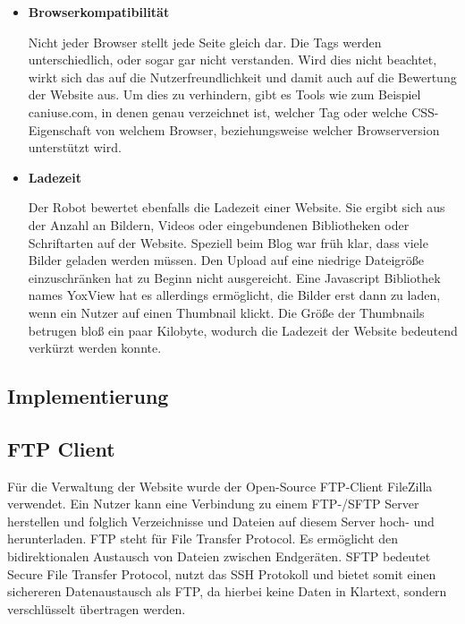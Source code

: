 {\begin{itemize}
      \item \textbf{Browserkompatibilität}

        Nicht jeder Browser stellt jede Seite gleich dar. Die Tags werden unterschiedlich, oder sogar gar nicht verstanden. Wird dies nicht beachtet, wirkt sich das auf die Nutzerfreundlichkeit
        und damit auch auf die Bewertung der Website aus. Um dies zu verhindern, gibt es Tools wie zum Beispiel {caniuse.com\cite{caniuse}}, in denen genau verzeichnet ist, welcher Tag oder welche CSS-Eigenschaft
        von welchem Browser, beziehungsweise welcher Browserversion unterstützt wird.

      \item \textbf{Ladezeit}

        Der Robot bewertet ebenfalls die Ladezeit einer Website. Sie ergibt sich aus der Anzahl an Bildern, Videos oder eingebundenen Bibliotheken oder Schriftarten auf der Website.
        Speziell beim Blog war früh klar, dass viele Bilder geladen werden müssen. Den Upload auf eine niedrige Dateigröße einzuschränken hat zu Beginn nicht ausgereicht.
        Eine Javascript Bibliothek names {YoxView\cite{yoxview}} hat es allerdings ermöglicht, die Bilder erst dann zu laden, wenn ein Nutzer auf einen Thumbnail klickt. Die Größe der Thumbnails betrugen bloß
        ein paar Kilobyte, wodurch die Ladezeit der Website bedeutend verkürzt werden konnte.

    \end{itemize}

  \subsection{Implementierung}

    \subsection*{FTP Client}
    Für die Verwaltung der Website wurde der Open-Source FTP-Client {FileZilla\cite{filezilla}} verwendet. Ein Nutzer kann eine Verbindung zu einem FTP-/SFTP
    Server herstellen und folglich Verzeichnisse und Dateien auf diesem Server hoch- und herunterladen. {FTP\cite{ftp}} steht für File Transfer Protocol. Es ermöglicht
    den bidirektionalen Austausch von Dateien zwischen Endgeräten. {SFTP\cite{sftp}} bedeutet Secure File Transfer Protocol, nutzt das SSH Protokoll und bietet somit
    einen sichereren Datenaustausch als FTP, da hierbei keine Daten in Klartext, sondern verschlüsselt übertragen werden.

}

